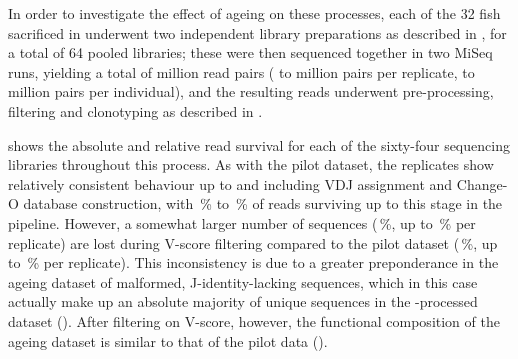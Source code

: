 In order to investigate the effect of ageing on these processes, each of the 32 fish %
sacrificed in  underwent two independent library preparations as described in , %
for a total of 64 pooled libraries; these were then sequenced together in two MiSeq runs, yielding a total of  million read pairs ( to  million pairs per replicate,  to  million pairs per individual), and the resulting reads underwent pre-processing, filtering and clonotyping as described in . 

 shows the absolute and relative read survival for each of the sixty-four sequencing libraries throughout this process. As with the pilot dataset, the replicates show relatively consistent behaviour up to and including VDJ assignment and Change-O database construction, with \,\% to \,\% of reads surviving up to this stage in the pipeline. However, a somewhat %
 larger number of sequences (\,\%, up to \,\% per replicate) are lost during V-score filtering compared to the pilot dataset (\,\%, up to \,\% per replicate). This inconsistency is due to a greater preponderance in the ageing dataset of malformed, J-identity-lacking sequences, which in this case actually make up an absolute majority of unique sequences in the -processed dataset (). After filtering on V-score, however, the functional composition of the ageing dataset is similar to that of the pilot data ().

